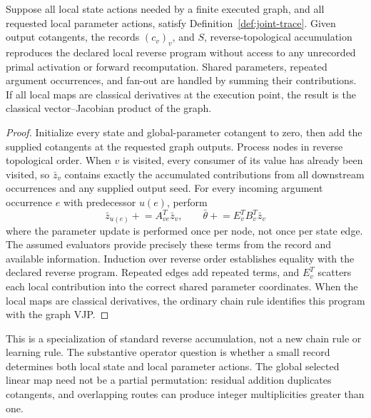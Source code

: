 \begin{theorem}
\label{thm:appendix-composition}
Suppose all local state actions needed by a finite executed graph, and all
requested local parameter actions, satisfy Definition~\ref{def:joint-trace}.
Given output cotangents, the records $(c_v)_v$, and $S$, reverse-topological
accumulation reproduces the declared local reverse program without access to
any unrecorded primal activation or forward recomputation. Shared parameters,
repeated argument occurrences, and fan-out are handled by summing their
contributions. If all local maps are classical derivatives at the execution
point, the result is the classical vector--Jacobian product of the graph.
\end{theorem}

\begin{proof}
Initialize every state and global-parameter cotangent to zero, then add the
supplied cotangents at the requested graph outputs. Process nodes in reverse
topological order. When $v$ is visited, every consumer of its value has
already been visited, so $\bar z_v$ contains exactly the accumulated
contributions from all downstream occurrences and any supplied output seed.
For every incoming argument occurrence $e$ with predecessor $u(e)$, perform
\begin{equation}
 \bar z_{u(e)}\mathrel{+}=A_{ve}^{T}\bar z_v,
 \qquad
 \bar\theta\mathrel{+}=E_v^{T}B_v^{T}\bar z_v
 \label{eq:reverse-accumulation}
\end{equation}
where the parameter update is performed once per node, not once per state
edge. The assumed evaluators provide precisely these terms from the record
and available information. Induction over reverse order establishes equality
with the declared reverse program. Repeated edges add repeated terms, and
$E_v^{T}$ scatters each local contribution into the correct shared parameter
coordinates. When the local maps are classical derivatives, the ordinary
chain rule identifies this program with the graph VJP.
\end{proof}

This is a specialization of standard reverse accumulation, not a new chain
rule or learning rule. The substantive operator question is whether a small
record determines both local state and local parameter actions. The global
selected linear map need not be a partial permutation: residual addition
duplicates cotangents, and overlapping routes can produce integer
multiplicities greater than one.

